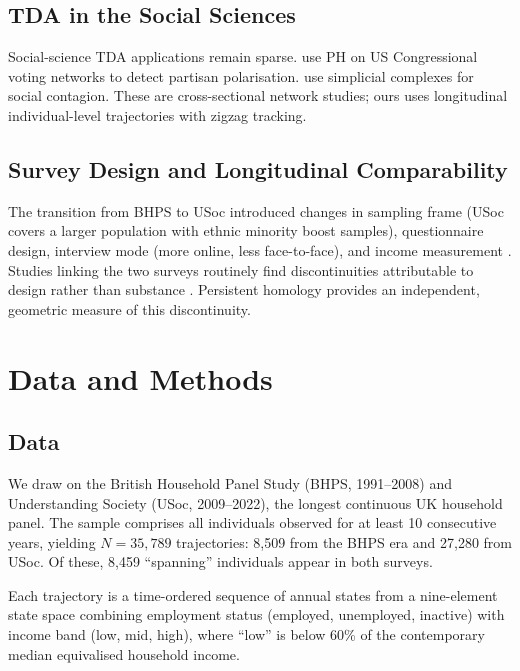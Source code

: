 \subsection{TDA in the Social Sciences}

Social-science TDA applications remain sparse.
\citet{feng2021persistent} use PH on US Congressional voting networks to detect
partisan polarisation.
\citet{iacopini2019simplicial} use simplicial complexes for social contagion.
These are cross-sectional network studies; ours uses longitudinal individual-level
trajectories with zigzag tracking.

\subsection{Survey Design and Longitudinal Comparability}

The transition from BHPS to USoc introduced changes in sampling frame (USoc
covers a larger population with ethnic minority boost samples), questionnaire
design, interview mode (more online, less face-to-face), and income measurement
\citep{lynn2009methodology, buck2011understanding}.
Studies linking the two surveys routinely find discontinuities attributable to
design rather than substance \citep{benzeval2020understanding}.
Persistent homology provides an independent, geometric measure of this
discontinuity.

\section{Data and Methods}
\label{sec:data}

\subsection{Data}

We draw on the British Household Panel Study (BHPS, 1991--2008) and
Understanding Society (USoc, 2009--2022), the longest continuous UK household
panel.
The sample comprises all individuals observed for at least 10 consecutive years,
yielding $N = 35{,}789$ trajectories: 8,509 from the BHPS era and 27,280 from
USoc.
Of these, 8,459 ``spanning'' individuals appear in both surveys.

Each trajectory is a time-ordered sequence of annual states from a nine-element
state space combining employment status (employed, unemployed, inactive) with
income band (low, mid, high), where ``low'' is below 60\% of the contemporary
median equivalised household income.

